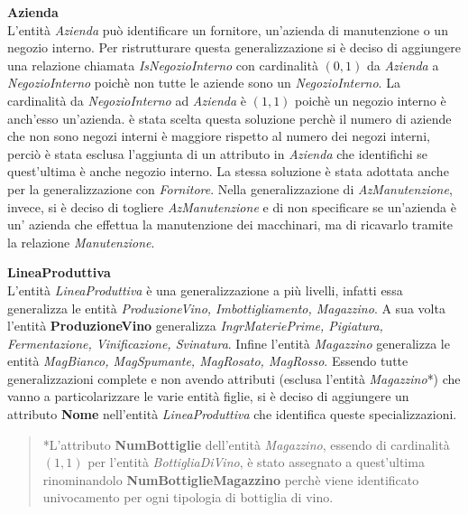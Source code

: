 \begin{flushleft}
	\textbf{\large{Azienda}}\\
	L'entità \emph{Azienda} può identificare un fornitore, un'azienda di manutenzione o un negozio interno. Per ristrutturare questa generalizzazione si è deciso di aggiungere una relazione chiamata \emph{IsNegozioInterno} con cardinalità $(0,1)$ da \emph{Azienda} a \emph{NegozioInterno} poichè non tutte le aziende sono un \emph{NegozioInterno}. La cardinalità da \emph{NegozioInterno} ad \emph{Azienda} è $(1,1)$ poichè un negozio interno è anch'esso un'azienda. è stata scelta questa soluzione perchè il numero di aziende che non sono negozi interni è maggiore rispetto al numero dei negozi interni, perciò è stata esclusa l'aggiunta di un attributo in \emph{Azienda} che identifichi se quest'ultima è anche negozio interno. La stessa soluzione è stata adottata anche per la generalizzazione con \emph{Fornitore}. Nella generalizzazione di \emph{AzManutenzione}, invece, si è deciso di togliere \emph{AzManutenzione} e di non specificare se un'azienda è un' azienda che effettua la manutenzione dei macchinari, ma di ricavarlo tramite la relazione \emph{Manutenzione}.
\end{flushleft}

\begin{flushleft}
	\textbf{\large{LineaProduttiva}}\\
	L'entità \emph{LineaProduttiva} è una generalizzazione a più livelli, infatti essa generalizza le entità \emph{ProduzioneVino, Imbottigliamento, Magazzino}. A sua volta l'entità \textbf{ProduzioneVino} generalizza \emph{IngrMateriePrime, Pigiatura, Fermentazione, Vinificazione, Svinatura}. Infine l'entità \emph{Magazzino} generalizza le entità \emph{MagBianco, MagSpumante, MagRosato, MagRosso}. Essendo tutte generalizzazioni complete e non avendo attributi (esclusa l'entità \emph{Magazzino}*) che vanno a particolarizzare le varie entità figlie, si è deciso di aggiungere un attributo \textbf{Nome} nell'entità \emph{LineaProduttiva} che identifica queste specializzazioni.
\end{flushleft}

\begin{verse}
	*L'attributo \textbf{NumBottiglie} dell'entità \emph{Magazzino}, essendo di cardinalità $(1,1)$ per l'entità \emph{BottigliaDiVino}, è stato assegnato a quest'ultima rinominandolo \textbf{NumBottiglieMagazzino} perchè viene identificato univocamento per ogni tipologia di bottiglia di vino.
\end{verse}